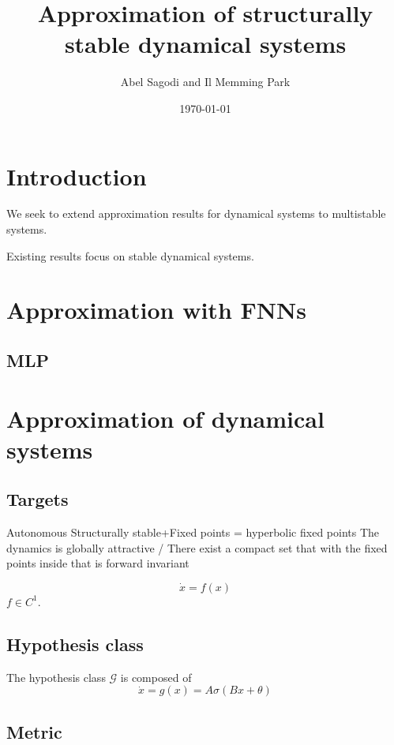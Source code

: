 \documentclass{article}
\title{Approximation of structurally stable dynamical systems}
\author{Abel Sagodi and Il Memming Park}
\date{\today}
\theoremstyle{definition}
\theoremstyle{remark}
\begin{document}
\maketitle

\section{Introduction}
We seek to extend approximation results for dynamical systems to multistable systems.


Existing results focus on stable dynamical systems.


\section{Approximation with FNNs}

\subsection{MLP}%
\citep{funahashi1989}



\section{Approximation of dynamical systems}

\subsection{Targets}
Autonomous
Structurally stable+Fixed points = hyperbolic fixed points
The dynamics is globally attractive / There exist a compact set that with the fixed points inside that is forward invariant 

\begin{equation}
\dot x = f(x)
\end{equation}
$f\in C^1$.

\subsection{Hypothesis class}
The hypothesis class $\mathcal{G}$ is composed of
\begin{equation}
\dot x = g(x) = A\sigma(Bx+\theta)
\end{equation}


\subsection{Metric}
\end{document}
